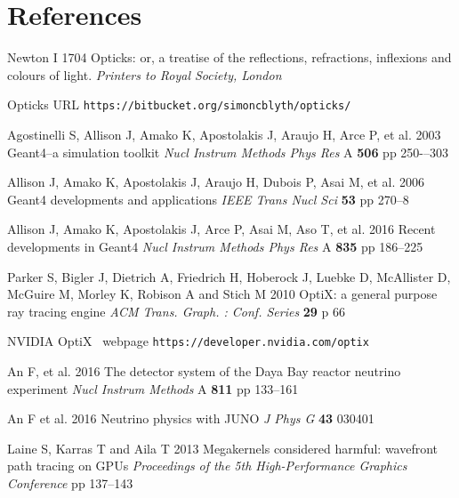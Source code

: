 \documentclass[a4paper]{jpconf}
\begin{document}
\section*{References}
\begin{thebibliography}{9}

Newton I 
1704 
Opticks: or, a treatise of the reflections, refractions, inflexions and colours of light.
{\it Printers to Royal Society, London} 

Opticks URL {\tt https://bitbucket.org/simoncblyth/opticks/}

Agostinelli S, Allison J, Amako K, Apostolakis J, Araujo H, Arce P, et al. 
2003  
Geant4--a simulation toolkit 
{\it Nucl Instrum Methods Phys Res} A {\bf 506} pp 250-–303 

Allison J, Amako K, Apostolakis J, Araujo H, Dubois P, Asai M, et al. 
2006 
Geant4 developments and applications 
{\it IEEE Trans Nucl Sci} {\bf 53} pp 270--8

Allison J, Amako K, Apostolakis J, Arce P, Asai M, Aso T, et al. 
2016 
Recent developments in Geant4 
{\it Nucl Instrum Methods Phys Res} A {\bf 835} pp 186--225

Parker S, Bigler J, Dietrich A, Friedrich H, Hoberock J, Luebke D, McAllister D, McGuire M, Morley K, Robison A and Stich M 
2010 
OptiX: a general purpose ray tracing engine
{\it ACM Trans. Graph. : Conf. Series} {\bf 29} p 66 

NVIDIA{\textregistered} OptiX\texttrademark~ webpage {\tt https://developer.nvidia.com/optix}



An F, et al.
2016
The detector system of the Daya Bay reactor neutrino experiment
{\it Nucl Instrum Methods} A {\bf 811} pp 133--161

An F et al.  
2016
Neutrino physics with JUNO
{\it J Phys G} {\bf 43} 030401

Laine S, Karras T and Aila T
2013
Megakernels considered harmful: wavefront path tracing on GPUs
{\it Proceedings of the 5th High-Performance Graphics Conference} pp 137--143


\end{thebibliography}
\end{document}
